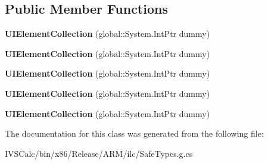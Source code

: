 \subsection*{Public Member Functions}
\begin{DoxyCompactItemize}
\item 
\mbox{\label{class_windows_1_1_u_i_1_1_xaml_1_1_controls_1_1_u_i_element_collection_a85e079be009d4f88dd3bd9306defd4bf}} 
{\bfseries U\+I\+Element\+Collection} (global\+::\+System.\+Int\+Ptr dummy)
\item 
\mbox{\label{class_windows_1_1_u_i_1_1_xaml_1_1_controls_1_1_u_i_element_collection_a85e079be009d4f88dd3bd9306defd4bf}} 
{\bfseries U\+I\+Element\+Collection} (global\+::\+System.\+Int\+Ptr dummy)
\item 
\mbox{\label{class_windows_1_1_u_i_1_1_xaml_1_1_controls_1_1_u_i_element_collection_a85e079be009d4f88dd3bd9306defd4bf}} 
{\bfseries U\+I\+Element\+Collection} (global\+::\+System.\+Int\+Ptr dummy)
\item 
\mbox{\label{class_windows_1_1_u_i_1_1_xaml_1_1_controls_1_1_u_i_element_collection_a85e079be009d4f88dd3bd9306defd4bf}} 
{\bfseries U\+I\+Element\+Collection} (global\+::\+System.\+Int\+Ptr dummy)
\item 
\mbox{\label{class_windows_1_1_u_i_1_1_xaml_1_1_controls_1_1_u_i_element_collection_a85e079be009d4f88dd3bd9306defd4bf}} 
{\bfseries U\+I\+Element\+Collection} (global\+::\+System.\+Int\+Ptr dummy)
\end{DoxyCompactItemize}


The documentation for this class was generated from the following file\+:\begin{DoxyCompactItemize}
\item 
I\+V\+S\+Calc/bin/x86/\+Release/\+A\+R\+M/ilc/Safe\+Types.\+g.\+cs\end{DoxyCompactItemize}
